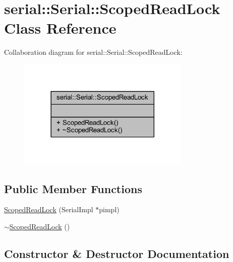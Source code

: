 \hypertarget{class_serial_1_1_scoped_read_lock}{}\section{serial\+:\+:Serial\+:\+:Scoped\+Read\+Lock Class Reference}
\label{class_serial_1_1_scoped_read_lock}


Collaboration diagram for serial\+:\+:Serial\+:\+:Scoped\+Read\+Lock\+:\nopagebreak
\begin{figure}[H]
\begin{center}
\leavevmode
\includegraphics[width=233pt]{class_serial_1_1_scoped_read_lock__coll__graph}
\end{center}
\end{figure}
\subsection*{Public Member Functions}
\begin{DoxyCompactItemize}
\item 
\mbox{\hyperlink{class_serial_1_1_scoped_read_lock_a54f59663807d8adfe6db712ee6103503}{Scoped\+Read\+Lock}} (Serial\+Impl $\ast$pimpl)
\item 
\mbox{\hyperlink{class_serial_1_1_scoped_read_lock_a5c061909b95231cec776c40094c878b4}{$\sim$\+Scoped\+Read\+Lock}} ()
\end{DoxyCompactItemize}


\subsection{Constructor \& Destructor Documentation}
\mbox{\label{class_serial_1_1_scoped_read_lock_a54f59663807d8adfe6db712ee6103503}} 
